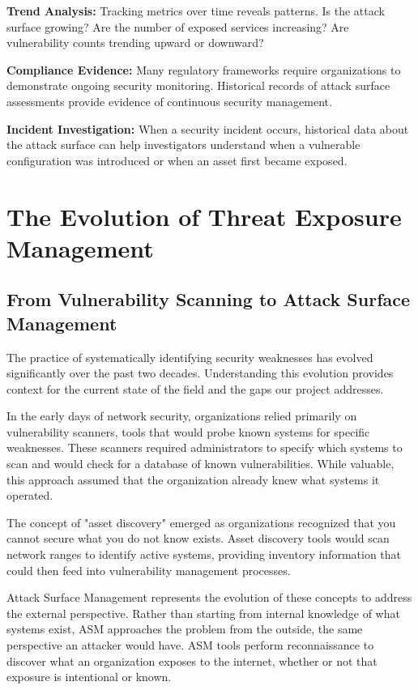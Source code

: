 \documentclass[a4paper,12pt]{report}
\begin{document}
\textbf{Trend Analysis:} Tracking metrics over time reveals patterns. Is the attack surface growing? Are the number of exposed services increasing? Are vulnerability counts trending upward or downward?\hfill \break

\textbf{Compliance Evidence:} Many regulatory frameworks require organizations to demonstrate ongoing security monitoring. Historical records of attack surface assessments provide evidence of continuous security management.\hfill \break

\textbf{Incident Investigation:} When a security incident occurs, historical data about the attack surface can help investigators understand when a vulnerable configuration was introduced or when an asset first became exposed.\hfill \break

\section{The Evolution of Threat Exposure Management}

\subsection{From Vulnerability Scanning to Attack Surface Management}

The practice of systematically identifying security weaknesses has evolved significantly over the past two decades. Understanding this evolution provides context for the current state of the field and the gaps our project addresses.\hfill \break

In the early days of network security, organizations relied primarily on vulnerability scanners, tools that would probe known systems for specific weaknesses. These scanners required administrators to specify which systems to scan and would check for a database of known vulnerabilities. While valuable, this approach assumed that the organization already knew what systems it operated.\hfill \break

The concept of "asset discovery" emerged as organizations recognized that you cannot secure what you do not know exists. Asset discovery tools would scan network ranges to identify active systems, providing inventory information that could then feed into vulnerability management processes.\hfill \break

Attack Surface Management represents the evolution of these concepts to address the external perspective. Rather than starting from internal knowledge of what systems exist, ASM approaches the problem from the outside, the same perspective an attacker would have. ASM tools perform reconnaissance to discover what an organization exposes to the internet, whether or not that exposure is intentional or known.\hfill \break
\end{document}

